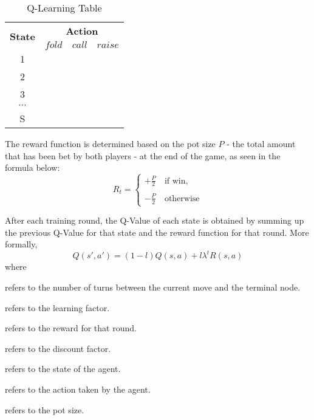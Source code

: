 \documentclass{article}
\begin{document}
\begin{table}[h!]
  \begin{center}
	\begin{tabular}{ c|c|c|c }
	\hline
	\multirow{2}{*}{\textbf{State}}&\multicolumn{3}{|c}{\textbf{Action}}\\
	\cline{2-4}
	& $fold$ & $call$ & $raise$\\ 
	\hline
	1\\
	2\\ 
	3\\ 
	$\cdots$\\
	S\\
	\hline
	\end{tabular}
	\caption{Q-Learning Table}
    \label{tab:table1}
  \end{center}
\end{table}
The reward function is determined based on the pot size $P$ - the total amount that has been bet by both players - at the end of the game, as seen in the formula below:
\begin{displaymath}
  R_t=
  \left\lbrace
  \begin{array}{l}
    +\frac{P}{2}\quad\text{if win,} \\
    \\
    -\frac{P}{2}\quad\text{otherwise}
  \end{array}
  \right.
\end{displaymath}

After each training round, the Q-Value of each state is obtained by summing up the previous Q-Value for that state and the reward function for that round. More formally,
\begin{displaymath}
Q\left(s',a'\right)=(1-l)Q\left(s,a\right)+l\lambda^{t}R\left(s,a\right)
\end{displaymath}
\noindent where

\begin{description}[style=multiline,leftmargin=10mm]
\item [\emph{t}]refers to the number of turns between the current move and the terminal node.
\item [\emph{l}]refers to the learning factor.
\item [\emph{R}]refers to the reward for that round.
\item [\emph{$\lambda$}]refers to the discount factor.
\item [\emph{s}]refers to the state of the agent.
\item [\emph{a}]refers to the action taken by the agent.
\item [\emph{P}]refers to the pot size.
\end{description}
\end{document}
